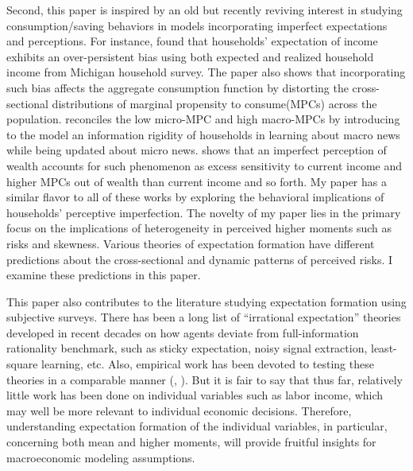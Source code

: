 \documentclass[12pt,notitlepage,onecolumn,aps,pra]{article}
\begin{document}
Second, this paper is inspired by an old but recently reviving interest
in studying consumption/saving behaviors in models incorporating
imperfect expectations and perceptions. For instance,
\cite{rozsypal_overpersistence_2017} found that households' expectation
of income exhibits an over-persistent bias using both expected and
realized household income from Michigan household survey. The paper also
shows that incorporating such bias affects the aggregate consumption
function by distorting the cross-sectional distributions of marginal
propensity to consume(MPCs) across the population.
\cite{carroll_sticky_2018} reconciles the low micro-MPC and high
macro-MPCs by introducing to the model an information rigidity of
households in learning about macro news while being updated about micro
news. \cite{lian2019imperfect} shows that an imperfect perception of
wealth accounts for such phenomenon as excess sensitivity to current
income and higher MPCs out of wealth than current income and so forth.
My paper has a similar flavor to all of these works by exploring the
behavioral implications of households' perceptive imperfection. The
novelty of my paper lies in the primary focus on the implications of
heterogeneity in perceived higher moments such as risks and skewness.
Various theories of expectation formation have different predictions
about the cross-sectional and dynamic patterns of perceived risks. I
examine these predictions in this paper.

This paper also contributes to the literature studying expectation
formation using subjective surveys. There has been a long list of
``irrational expectation'' theories developed in recent decades on how
agents deviate from full-information rationality benchmark, such as
sticky expectation, noisy signal extraction, least-square learning, etc.
Also, empirical work has been devoted to testing these theories in a
comparable manner (\cite{coibion2012can}, \cite{fuhrer2018intrinsic}).
But it is fair to say that thus far, relatively little work has been
done on individual variables such as labor income, which may well be
more relevant to individual economic decisions. Therefore, understanding
expectation formation of the individual variables, in particular,
concerning both mean and higher moments, will provide fruitful insights
for macroeconomic modeling assumptions.
\end{document}
